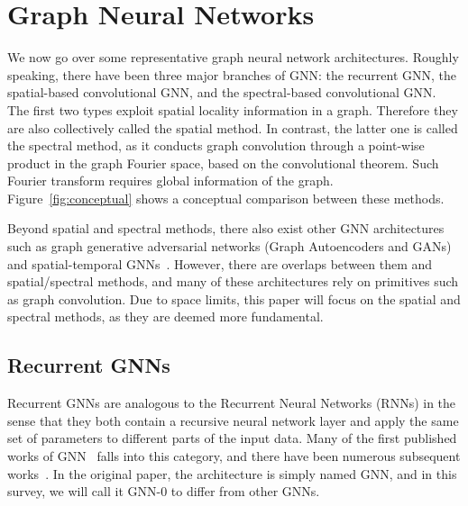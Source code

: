 \vspace{-2mm}
\section{Graph Neural Networks}\label{sec:gnn}
We now go over some representative graph neural network architectures. Roughly speaking, there have been three major branches of GNN: the recurrent GNN, the spatial-based convolutional GNN, and the spectral-based convolutional GNN. The first two types exploit spatial locality information in a graph. Therefore they are also collectively called the spatial method. In contrast, the latter one is called the spectral method, as it conducts graph convolution through a point-wise product in the graph Fourier space, based on the convolutional theorem. Such Fourier transform requires global information of the graph. Figure~\ref{fig:conceptual} shows a conceptual comparison between these methods.

Beyond spatial and spectral methods, there also exist other GNN architectures such as graph generative adversarial networks (Graph Autoencoders and GANs)~\cite{gae, ggan} and spatial-temporal GNNs~\cite{gaan, stgnn}. However, there are overlaps between them and spatial/spectral methods, and many of these architectures rely on primitives such as graph convolution. Due to space limits, this paper will focus on the spatial and spectral methods, as they are deemed more fundamental.


\subsection{Recurrent GNNs}
Recurrent GNNs are analogous to the Recurrent Neural Networks (RNNs) in the sense that they both contain a recursive neural network layer and apply the same set of parameters to different parts of the input data. Many of the first published works of GNN~\cite{gnn0} falls into this category, and there have been numerous subsequent works~\cite{gesn, ggnn, sse}. In the original paper, the architecture is simply named GNN, and in this survey, we will call it GNN-0 to differ from other GNNs.
